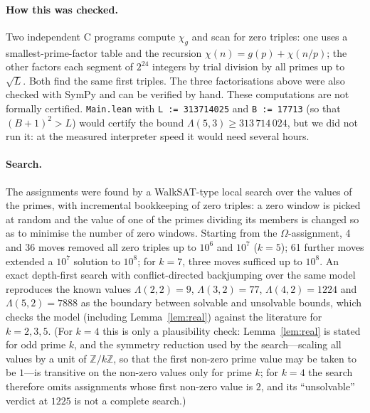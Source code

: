 \documentclass[11pt]{article}
\numberwithin{equation}{section}
\theoremstyle{definition}
\theoremstyle{remark}
\newcommand{\Z}{\mathbb Z}
\begin{document}
\paragraph{How this was checked.} Two independent C programs compute $\chi_g$ and scan for zero triples:
one uses a smallest-prime-factor table and the recursion $\chi(n)=g(p)+\chi(n/p)$; the other factors each
segment of $2^{24}$ integers by trial division by all primes up to $\sqrt{L}$. Both find the same
first triples. The three factorisations above were also checked with SymPy and can be verified by hand.
These computations are not formally certified. \texttt{Main.lean} with \texttt{L := 313714025} and
\texttt{B := 17713} (so that $(B+1)^2>L$) would certify the bound $\Lambda(5,3)\ge313\,714\,024$, but
we did not run it: at the measured interpreter speed it would need several hours.

\paragraph{Search.} The assignments were found by a WalkSAT-type local search over the values of the
primes, with incremental bookkeeping of zero triples: a zero window is picked at random and the value of
one of the primes dividing its members is changed so as to minimise the number of zero windows. Starting
from the $\Omega$-assignment, 4 and 36 moves removed all zero triples up to $10^6$ and $10^7$ ($k=5$);
61 further moves extended a $10^7$ solution to $10^8$; for $k=7$, three moves sufficed up to $10^8$.
An exact depth-first search with conflict-directed backjumping over the same model reproduces the known
values $\Lambda(2,2)=9$, $\Lambda(3,2)=77$, $\Lambda(4,2)=1224$ and $\Lambda(5,2)=7888$ as the boundary
between solvable and unsolvable bounds, which checks the model (including Lemma~\ref{lem:real}) against the
literature for $k=2,3,5$. (For $k=4$ this is only a plausibility check: Lemma~\ref{lem:real} is stated
for odd prime $k$, and the symmetry reduction used by the search---scaling all values by a unit of
$\Z/k\Z$, so that the first non-zero prime value may be taken to be $1$---is transitive on the non-zero
values only for prime $k$; for $k=4$ the search therefore omits assignments whose first non-zero value
is $2$, and its ``unsolvable'' verdict at $1225$ is not a complete search.)
\end{document}
